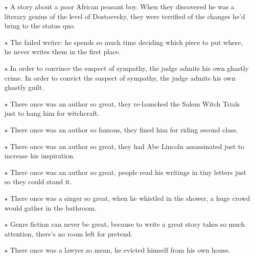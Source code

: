 \documentclass[oneside]{book}
\begin{document}

$\star$ A story about a poor African peasant boy.  When they discovered he was a literary
genius of the level of Dostoevsky, they were terrified of the changes he'd bring to the
status quo.

$\star$ The failed writer: he spends so much time deciding which piece to put where,
he never writes them in the first place.


$\star$ In order to convince the suspect of sympathy, the judge admits his own ghastly
crime.  In order to convict the suspect of sympathy, the judge admits his own ghastly guilt.


$\star$ There once was an author so great, they re-launched the Salem Witch Trials
just to hang him for witchcraft.

$\star$ There once was an author so famous, they fined him for riding second class.

$\star$ There once was an author so great, they had Abe Lincoln assassinated just to
increase his inspiration.

$\star$ There once was an author so great, people read his writings in tiny letters
just so they could stand it.

$\star$ There once was a singer so great, when he whistled in the shower, a huge
crowd would gather in the bathroom.

$\star$ Genre fiction can never be great, because to write a great story takes so much
attention, there's no room left for pretend.


$\star$ There once was a lawyer so mean, he evicted himself from his own house.

\end{document}
